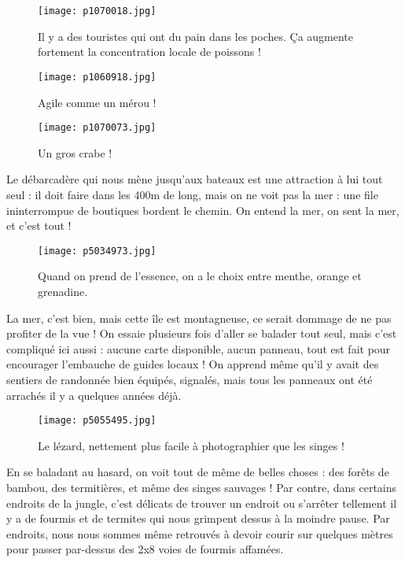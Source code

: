 \documentclass{book}
\begin{document}
\begin{figure}[h]
\centering
\texttt{[image: p1070018.jpg]}
\caption*{Il y a des touristes qui ont du pain dans les poches. Ça augmente fortement la concentration locale de poissons !}
\end{figure}


\begin{figure}[h]
\centering
\texttt{[image: p1060918.jpg]}
\caption*{Agile comme un mérou !}
\end{figure}


\begin{figure}[h]
\centering
\texttt{[image: p1070073.jpg]}
\caption*{Un gros crabe !}
\end{figure}

Le débarcadère qui nous mène jusqu'aux bateaux est une attraction à lui tout seul : il doit faire dans les 400m de long, mais on ne voit pas la mer : une file ininterrompue de boutiques bordent le chemin. On entend la mer, on sent la mer, et c'est tout !


\begin{figure}[h]
\centering
\texttt{[image: p5034973.jpg]}
\caption*{Quand on prend de l'essence, on a le choix entre menthe, orange et grenadine.}
\end{figure}

La mer, c'est bien, mais cette île est montagneuse, ce serait dommage de ne pas profiter de la vue ! On essaie plusieurs fois d'aller se balader tout seul, mais c'est compliqué ici aussi : aucune carte disponible, aucun panneau, tout est fait pour encourager l'embauche de guides locaux ! On apprend même qu'il y avait des sentiers de randonnée bien équipés, signalés, mais tous les panneaux ont été arrachés il y a quelques années déjà.


\begin{figure}[h]
\centering
\texttt{[image: p5055495.jpg]}
\caption*{Le lézard, nettement plus facile à photographier que les singes !}
\end{figure}

En se baladant au hasard, on voit tout de même de belles choses : des forêts de bambou, des termitières, et même des singes sauvages ! Par contre, dans certains endroits de la jungle, c'est délicats de trouver un endroit ou s'arrêter tellement il y a de fourmis et de termites qui nous grimpent dessus à la moindre pause. Par endroits, nous nous sommes même retrouvés à devoir courir sur quelques mètres pour passer par-dessus des 2x8 voies de fourmis affamées.
\end{document}
